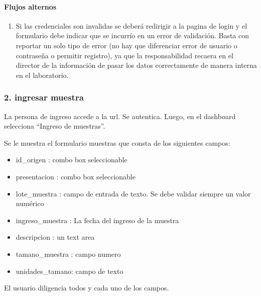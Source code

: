 \documentclass[letterpaper,10pt,spanish]{sphinxmanual}
\begin{document}
\paragraph{Flujos alternos}
\label{\detokenize{requerimientos/srs:flujos-alternos}}\begin{enumerate}
%
\item {} 
Si las credenciales son invalidas se deberá redirigir a la pagina de login y el formulario debe
indicar que se incurrío en un error de validación. Basta con reportar un solo tipo de error (no hay que diferenciar error de usuario o contraseña o permitir registro), ya que
la responsabilidad recaera en el director de la información de pasar los datos correctamente de  manera interna en el laboratorio.

\end{enumerate}


\subsubsection{2. ingresar muestra}
\label{\detokenize{requerimientos/srs:ingresar-muestra}}
La persona de ingreso accede a la url. Se autentica.
Luego, en el dashboard selecciona “Ingreso de muestras”.

Se le muestra el formulario muestras que consta de los siguientes campos:
\begin{itemize}
\item {} 
id\_origen : combo box seleccionable

\item {} 
presentacion : combo box seleccionable

\item {} 
lote\_muestra : campo de entrada de texto. Se debe validar siempre un valor numérico

\item {} 
ingreso\_muestra : La fecha del ingreso de la muestra

\item {} 
descripcion : un text area

\item {} 
tamano\_muestra : campo numero

\item {} 
unidades\_tamano: campo de texto

\end{itemize}

El usuario diligencia todos y cada uno de los campos.
\end{document}
